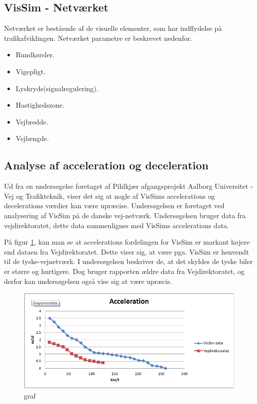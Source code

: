 \subsection{VisSim - Netværket}
Netværket er bestående af de visuelle elementer, som har indflydelse på trafikafviklingen.
Netværket parametre er beskrevet nedenfor.

\begin{itemize}
\item Rundkørsler.
\item Vigepligt.
\item Lyskryds(signalregulering).
\item Hastighedszone.
\item Vejbredde.
\item Vejlængde.
\end{itemize}

\subsection{Analyse af acceleration og deceleration}
Ud fra en undersøgelse foretaget af Pihlkjær afgangsprojekt Aalborg Universitet - Vej og Trafikteknik, viser det sig at nogle af VisSims accelerations og decelerations værdier kan være upræcise. Undersøgelsen er foretaget ved analysering af VisSim på de danske vej-netværk.  Undersøgelsen bruger data fra vejdirektoratet, dette data sammenlignes med VisSims accelerations data.

På figur \ref{GrafForAccelerationVisSim}, kan man se at accelerations fordelingen for VisSim er markant højere end dataen fra Vejdirektoratet. Dette viser sig, at være pga. VisSim er henvendt til de tyske-vejnetværk. I undersøgelsen beskriver de, at det skyldes de tyske biler er større og hurtigere. Dog bruger rapporten ældre data fra Vejdirektoratet, og derfor kan undersøgelsen også vise sig at være upræcis.

\begin{figure}
\begin{center}
\includegraphics[width=1.0\textwidth]{Pictures/Teknologianalyse/GrafForAccelerationVisSim.png}
\end{center}
\caption{graf}
\label{GrafForAccelerationVisSim}
\end{figure}

